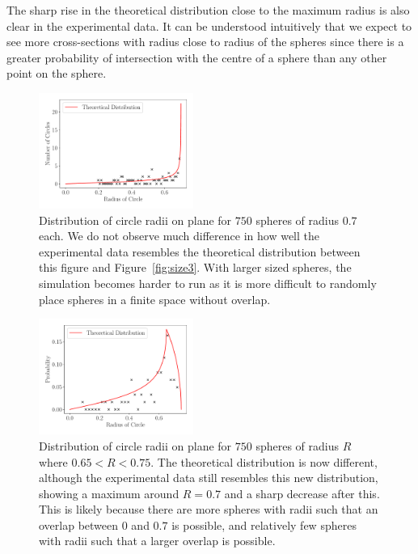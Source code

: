 \documentclass[journal]{IEEEtran}
\begin{document}
The sharp rise in the theoretical distribution close to the maximum radius is
also clear in the experimental data. It can be understood intuitively that we
expect to see more cross-sections with radius close to radius of the spheres
since there is a greater probability of intersection with the centre of a sphere
than any other point on the sphere.

\begin{figure}%
\begin{center}
\includegraphics[width=0.45\textwidth]{./../Figures/750_07.pdf}
\caption{Distribution of circle radii on plane for $750$ spheres of radius $0.7$
  each. We do not observe much difference in how well the experimental data
  resembles the theoretical distribution between this figure and
  Figure~\ref{fig:size3}. With larger sized spheres, the simulation becomes harder
  to run as it is more difficult to randomly place spheres in a finite space
  without overlap.}\label{fig:size7}
\end{center}
\end{figure}

\begin{figure}[H]%
\begin{center}
\includegraphics[width=0.45\textwidth]{./../Figures/750_07_random.pdf}
\caption{Distribution of circle radii on plane for $750$ spheres of radius $R$
  where $0.65 < R < 0.75$. The theoretical distribution is now different,
  although the experimental data still resembles this new distribution, showing
  a maximum around $R = 0.7$ and a sharp decrease after this. This is likely
  because there are more spheres with radii such that an overlap between $0$ and
  $0.7$ is possible, and relatively few spheres with radii such that a larger
  overlap is possible.}
\label{fig:random}
\end{center}
\end{figure}
\end{document}
